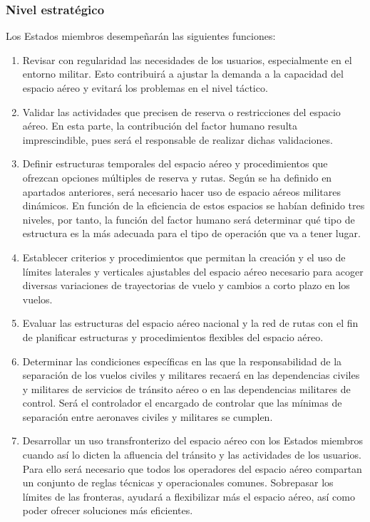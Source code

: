 \subsubsection{Nivel estratégico}

Los Estados miembros desempeñarán las siguientes funciones:

\begin{enumerate}
    \item Revisar con regularidad las necesidades de los usuarios, especialmente en el entorno militar. Esto contribuirá a ajustar la demanda a la capacidad del espacio aéreo y evitará los problemas en el nivel táctico.
    \item Validar las actividades que precisen de reserva o restricciones del espacio aéreo. En esta parte, la contribución del factor humano resulta imprescindible, pues será el responsable de realizar dichas validaciones.
    \item Definir estructuras temporales del espacio aéreo y procedimientos que ofrezcan opciones múltiples de reserva y rutas. Según se ha definido en apartados anteriores, será necesario hacer uso de espacio aéreos militares dinámicos. En función de la eficiencia de estos espacios se habían definido tres niveles, por tanto, la función del factor humano será determinar qué tipo de estructura es la más adecuada para el tipo de operación que va a tener lugar.
    \item Establecer criterios y procedimientos que permitan la creación y el uso de límites laterales y verticales ajustables del espacio aéreo necesario para acoger diversas variaciones de trayectorias de vuelo y cambios a corto plazo en los vuelos.
    \item Evaluar las estructuras del espacio aéreo nacional y la red de rutas con el fin de planificar estructuras y procedimientos flexibles del espacio aéreo.
    \item Determinar las condiciones específicas en las que la responsabilidad de la separación de los vuelos civiles y militares recaerá en las dependencias civiles y militares de servicios de tránsito aéreo o en las dependencias militares de control. Será el controlador el encargado de controlar que las mínimas de separación entre aeronaves civiles y militares se cumplen. 
    \item Desarrollar un uso transfronterizo del espacio aéreo con los Estados miembros cuando así lo dicten la afluencia del tránsito y las actividades de los usuarios. Para ello será necesario que todos los operadores del espacio aéreo compartan un conjunto de reglas técnicas y operacionales comunes. Sobrepasar los límites de las fronteras, ayudará a flexibilizar más el espacio aéreo, así como poder ofrecer soluciones más eficientes.

\end{enumerate}

